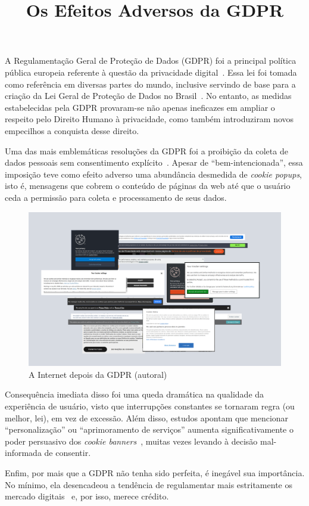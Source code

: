 \documentclass[
    report,
    11pt,
    oneside,
    a4paper,
    english,
    brazil,
    sumario=tradicional
    ]{abntex2}
\title{Os Efeitos Adversos da GDPR}
\begin{document}

\frenchspacing

\maketitle

\textual

A Regulamentação Geral de Proteção de Dados (GDPR) foi a principal política pública europeia referente à questão da privacidade digital~\cite{gdpr}. Essa lei foi tomada como referência em diversas partes do mundo, inclusive servindo de base para a criação da Lei Geral de Proteção de Dados no Brasil~\cite{lgpd}. No entanto, as medidas estabelecidas pela GDPR provaram-se não apenas ineficazes em ampliar o respeito pelo Direito Humano à privacidade, como também introduziram novos empecilhos a conquista desse direito.

Uma das mais emblemáticas resoluções da GDPR foi a proibição da coleta de dados pessoais sem consentimento explícito~\cite{data-consent}. Apesar de ``bem-intencionada'', essa imposição teve como efeito adverso uma abundância desmedida de \textit{cookie popups}, isto é, mensagens que cobrem o conteúdo de páginas da web até que o usuário ceda a permissão para coleta e processamento de seus dados.

\begin{figure}[h]
    \includegraphics[width=\textwidth]{cookies.png}
    \centering
    \caption{A Internet depois da GDPR (autoral)}
\end{figure}

Consequência imediata disso foi uma queda dramática na qualidade da experiência de usuário, visto que interrupções constantes se tornaram regra (ou melhor, lei), em vez de excessão. Além disso, estudos apontam que mencionar ``personalização'' ou ``aprimoramento de serviços'' aumenta significativamente o poder persuasivo dos \textit{cookie banners}~\cite{cookie-strategies}, muitas vezes levando à decisão mal-informada de consentir.

Enfim, por mais que a GDPR não tenha sido perfeita, é inegável sua importância. No mínimo, ela desencadeou a tendência de regulamentar mais estritamente os mercado digitais~\cite{dma} e, por isso, merece crédito.

\pagebreak

\postextual


\end{document}
